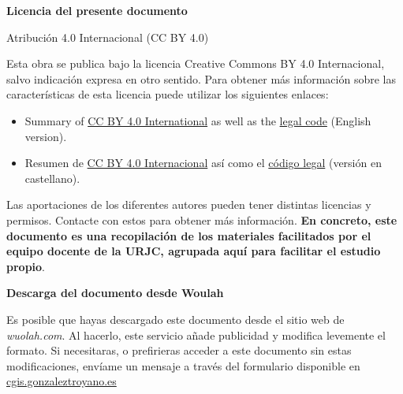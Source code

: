 \newpage
\textbf{Licencia del presente documento}
\begin{center}
    Atribución 4.0 Internacional (CC BY 4.0)
\end{center}
Esta obra se publica bajo la licencia Creative Commons BY 4.0 Internacional, salvo indicación expresa en otro sentido. Para obtener más información sobre las características de esta licencia puede utilizar los siguientes enlaces:
    \begin{itemize}
        \item Summary of \href{https://creativecommons.org/licenses/by/4.0/deed.en}{CC BY 4.0 International} as well as the \href{https://creativecommons.org/licenses/by/4.0/legalcode}{legal code} (English version).
        \item Resumen de \href{https://creativecommons.org/licenses/by/4.0/deed.es}{CC BY 4.0 Internacional} así como el \href{https://creativecommons.org/licenses/by/4.0/legalcode.es}{código legal} (versión en castellano).
    \end{itemize}
Las aportaciones de los diferentes autores pueden tener distintas licencias y permisos. Contacte con estos para obtener más información. \textbf{En concreto, este documento es una recopilación de los materiales facilitados por el equipo docente de la URJC, agrupada aquí para facilitar el estudio propio}.

\vspace{2em}
\textbf{Descarga del documento desde Woulah}

Es posible que hayas descargado este documento desde el sitio web de \textit{wuolah.com}. Al hacerlo, este servicio añade publicidad y modifica levemente el formato. Si necesitaras, o prefirieras acceder a este documento sin estas modificaciones, envíame un mensaje a través del formulario disponible en \href{https://cgis.gonzaleztroyano.es/?utm_source=cgis&utm_medium=apuntes_Y2_Q1&utm_campaign=DPR}{cgis.gonzaleztroyano.es}
\newpage